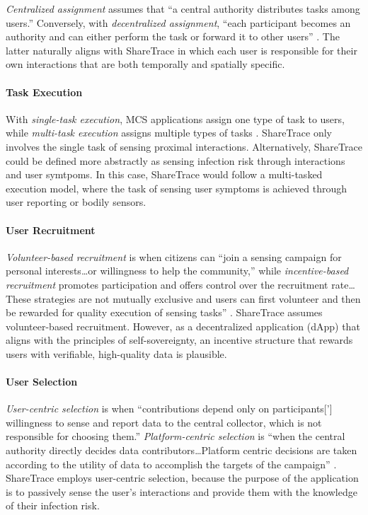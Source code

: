 \emph{Centralized assignment} assumes that ``a central authority distributes tasks among users.'' Conversely, with \emph{decentralized assignment}, ``each participant becomes an authority and can either perform the task or forward it to other users'' \citep{Capponi2019}. The latter naturally aligns with ShareTrace in which each user is responsible for their own interactions that are both temporally and spatially specific.

\paragraph{Task Execution}

With \emph{single-task execution}, MCS applications assign one type of task to users, while \emph{multi-task execution} assigns multiple types of tasks \citep{Capponi2019}. ShareTrace only involves the single task of sensing proximal interactions. Alternatively, ShareTrace could be defined more abstractly as sensing infection risk through interactions and user symtpoms. In this case, ShareTrace would follow a multi-tasked execution model, where the task of sensing user symptoms is achieved through user reporting or bodily sensors.

\paragraph{User Recruitment}

\emph{Volunteer-based recruitment} is when citizens can ``join a sensing campaign for personal interests{\ldots}or willingness to help the community,'' while \emph{incentive-based recruitment} promotes participation and offers control over the recruitment rate{\ldots}These strategies are not mutually exclusive and users can first volunteer and then be rewarded for quality execution of sensing tasks'' \citep{Capponi2019}. ShareTrace assumes volunteer-based recruitment. However, as a decentralized application (dApp) that aligns with the principles of self-sovereignty, an incentive structure that rewards users with verifiable, high-quality data is plausible.

\paragraph{User Selection}

\emph{User-centric selection} is when ``contributions depend only on participants['] willingness to sense and report data to the central collector, which is not responsible for choosing them.'' \emph{Platform-centric selection} is ``when the central authority directly decides data contributors{\ldots}Platform centric decisions are taken according to the utility of data to accomplish the targets of the campaign'' \citep{Capponi2019}. ShareTrace employs user-centric selection, because the purpose of the application is to passively sense the user's interactions and provide them with the knowledge of their infection risk.


